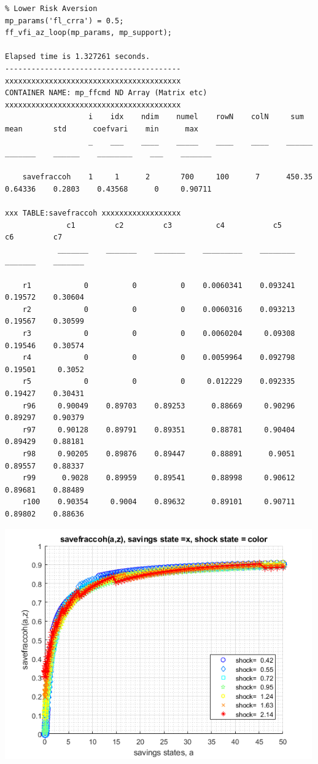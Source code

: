 \documentclass[
]{book}
\begin{document}
\begin{verbatim}
% Lower Risk Aversion
mp_params('fl_crra') = 0.5;
ff_vfi_az_loop(mp_params, mp_support);

Elapsed time is 1.327261 seconds.
----------------------------------------
xxxxxxxxxxxxxxxxxxxxxxxxxxxxxxxxxxxxxxxx
CONTAINER NAME: mp_ffcmd ND Array (Matrix etc)
xxxxxxxxxxxxxxxxxxxxxxxxxxxxxxxxxxxxxxxx
                   i    idx    ndim    numel    rowN    colN     sum       mean       std      coefvari    min      max  
                   _    ___    ____    _____    ____    ____    ______    _______    ______    ________    ___    _______

    savefraccoh    1     1      2       700     100      7      450.35    0.64336    0.2803    0.43568      0     0.90711

xxx TABLE:savefraccoh xxxxxxxxxxxxxxxxxx
              c1         c2         c3          c4           c5         c6         c7   
            _______    _______    _______    _________    ________    _______    _______

    r1            0          0          0    0.0060341    0.093241    0.19572    0.30604
    r2            0          0          0    0.0060316    0.093213    0.19567    0.30599
    r3            0          0          0    0.0060204     0.09308    0.19546    0.30574
    r4            0          0          0    0.0059964    0.092798    0.19501     0.3052
    r5            0          0          0     0.012229    0.092335    0.19427    0.30431
    r96     0.90049    0.89703    0.89253      0.88669     0.90296    0.89297    0.90379
    r97     0.90128    0.89791    0.89351      0.88781     0.90404    0.89429    0.88181
    r98     0.90205    0.89876    0.89447      0.88891      0.9051    0.89557    0.88337
    r99      0.9028    0.89959    0.89541      0.88998     0.90612    0.89681    0.88489
    r100    0.90354     0.9004    0.89632      0.89101     0.90711    0.89802    0.88636
\end{verbatim}

\includegraphics[width=5.20833in,height=\textheight]{img/fx_vfi_az_loop_images/figure_2.png}
\end{document}
